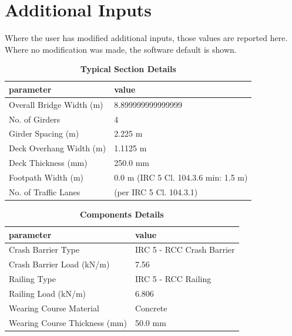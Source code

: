 \documentclass[12pt,a4paper]{report}
\numberwithin{table}{chapter}
\numberwithin{figure}{chapter}
\begin{document}
\newpage
\section{Additional Inputs}
\label{sec:additional-inputs}

Where the user has modified additional inputs, those values are reported here. Where no modification was made, the software default is shown.

\vspace{0.8cm}

\begin{longtable}{|L{5.5cm}|p{10.0cm}|}
\caption{\textbf{Typical Section Details}}
\hline
\textbf{parameter} & \textbf{value} \\
\hline
\textnormal{Overall Bridge Width (m)} & 8.899999999999999 \\[6pt]
\hline
\textnormal{No. of Girders} & 4 \\[6pt]
\hline
\textnormal{Girder Spacing (m)} & 2.225 m \\[6pt]
\hline
\textnormal{Deck Overhang Width (m)} & 1.1125 m \\[6pt]
\hline
\textnormal{Deck Thickness (mm)} & 250.0 mm \\[6pt]
\hline
\textnormal{Footpath Width (m)} & 0.0 m (IRC 5 Cl. 104.3.6 min: 1.5 m) \\[6pt]
\hline
\textnormal{No. of Traffic Lanes} &  (per IRC 5 Cl. 104.3.1) \\[6pt]
\hline
\end{longtable}

\vspace{0.8em}

\begin{longtable}{|L{5.5cm}|p{10.0cm}|}
\caption{\textbf{Components Details}}
\hline
\textbf{parameter} & \textbf{value} \\
\hline
\textnormal{Crash Barrier Type} & IRC 5 - RCC Crash Barrier \\[6pt]
\hline
\textnormal{Crash Barrier Load (kN/m)} & 7.56 \\[6pt]
\hline

\textnormal{Railing Type} & IRC 5 - RCC Railing \\[6pt]
\hline
\textnormal{Railing Load (kN/m)} & 6.806 \\[6pt]
\hline
\textnormal{Wearing Course Material} & Concrete \\[6pt]
\hline
\textnormal{Wearing Course Thickness (mm)} & 50.0 mm \\[6pt]
\hline
\end{longtable}
\end{document}
